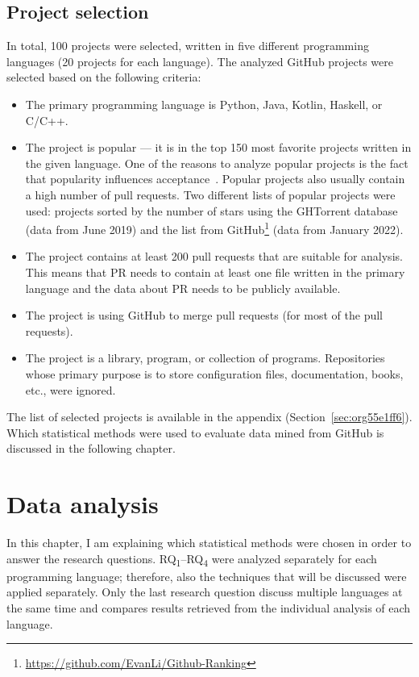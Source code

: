 \documentclass[digital,oneside,oldtable,nolof,nolot,nocover]{fithesis4}
\begin{document}
\section{Project selection}
\label{sec:org8f03877}
In total, 100 projects were selected, written in five different
programming languages (20 projects for each language). The analyzed GitHub
projects were selected based on the following criteria:
\begin{itemize}
\item The primary programming language is Python, Java, Kotlin, Haskell, or C/C++.
\item The project is popular --- it is in the top 150 most favorite projects written in the given language.
One of the reasons to analyze popular projects is the fact that popularity influences acceptance~\cite{social}.
Popular projects also usually contain a high number of pull requests.
Two different lists of popular projects were used: projects sorted by the
number of stars using the GHTorrent database (data from  June 2019) and the list from
GitHub\footnote{\url{https://github.com/EvanLi/Github-Ranking}} (data from  January 2022).
\item The project contains at least 200 pull requests that are suitable for analysis.
This means that PR needs to contain at least one file written in the
primary language and the data about PR needs to be publicly available.
\item The project is using GitHub to merge pull requests (for most of the pull requests).
\item The project is a library, program, or collection of programs. Repositories whose primary purpose is
to store configuration files, documentation, books, etc., were ignored.
\end{itemize}
The list of selected projects is available in the appendix (Section~\ref{sec:org55e1ff6}). Which statistical
methods were used to evaluate data mined from GitHub is discussed in the following chapter.
\chapter{Data analysis}
\label{sec:org1a63a72}
In this chapter, I am explaining which statistical methods were chosen in
order to answer the research questions. RQ\textsubscript{1}--RQ\textsubscript{4} were
analyzed separately for each programming language; therefore, also the
techniques that will be discussed were applied separately.  Only the last
research question discuss multiple languages at the same time and compares
results retrieved from the individual analysis of each language.
\end{document}
